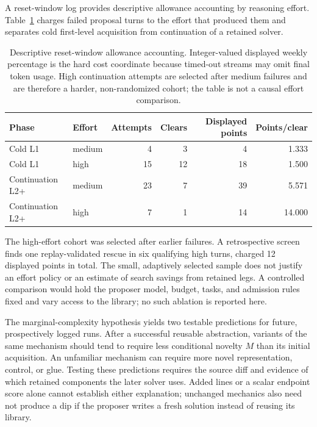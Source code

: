 \documentclass[11pt]{article}
\theoremstyle{definition}
\theoremstyle{remark}
\begin{document}
A reset-window log provides descriptive allowance accounting by reasoning effort. Table~\ref{tab:effort-economics} charges failed
proposal turns to the effort that produced them and separates cold first-level
acquisition from continuation of a retained solver.
\begin{table}[H]
\centering
\small
\begin{tabular}{@{}llrrrr@{}}
\toprule
Phase & Effort & Attempts & Clears & Displayed points & Points/clear \\
\midrule
Cold L1 & medium & 4 & 3 & 4 & 1.333 \\
Cold L1 & high & 15 & 12 & 18 & 1.500 \\
Continuation L2+ & medium & 23 & 7 & 39 & 5.571 \\
Continuation L2+ & high & 7 & 1 & 14 & 14.000 \\
\bottomrule
\end{tabular}
\caption{Descriptive reset-window allowance accounting. Integer-valued displayed
weekly percentage is the hard cost coordinate because timed-out streams may omit final
token usage. High continuation attempts are selected after medium failures and are
therefore a harder, non-randomized cohort; the table is not a causal effort comparison.}
\label{tab:effort-economics}
\end{table}
The high-effort cohort was selected after earlier failures. A retrospective screen
finds one replay-validated rescue in six qualifying high turns, charged 12 displayed
points in total. The small, adaptively selected sample does not justify an effort
policy or an estimate of search savings from retained legs. A controlled comparison
would hold the proposer model, budget, tasks, and admission rules fixed and vary
access to the library; no such ablation is reported here.



The marginal-complexity hypothesis yields two testable predictions for future,
prospectively logged runs. After a successful reusable abstraction, variants of
the same mechanism should tend to require less conditional novelty $M$ than its
initial acquisition. An unfamiliar mechanism can require more novel representation,
control, or glue. Testing these predictions requires the source diff and evidence
of which retained components the later solver uses. Added lines or a scalar endpoint
score alone cannot establish either explanation; unchanged mechanics also need not
produce a dip if the proposer writes a fresh solution instead of reusing its library.
\end{document}

